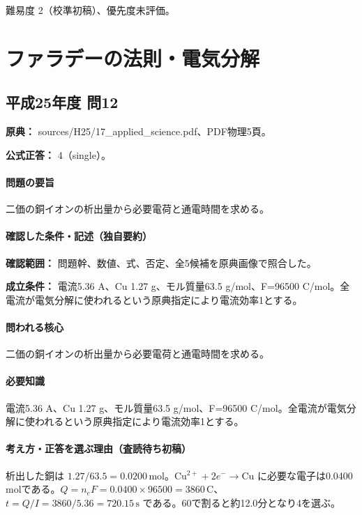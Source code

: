 \par 難易度 2（校準初稿）、優先度未評価。

\section{ファラデーの法則・電気分解}

\subsection{平成25年度 問12}
\label{q:h25-reg-applied-12}

\noindent\textbf{原典：} sources/H25/17\_applied\_science.pdf、PDF物理5頁。

\textbf{公式正答：} 4（single）。

\paragraph{問題の要旨} 二価の銅イオンの析出量から必要電荷と通電時間を求める。

\paragraph{確認した条件・記述（独自要約）}\mbox{}\par

\noindent\textbf{確認範囲：} 問題幹、数値、式、否定、全5候補を原典画像で照合した。\par

\noindent\textbf{成立条件：} 電流5.36 A、Cu 1.27 g、モル質量63.5 g/mol、F=\allowbreak{}96500 C/mol。全電流が電気分解に使われるという原典指定により電流効率1とする。\par

\paragraph{問われる核心} 二価の銅イオンの析出量から必要電荷と通電時間を求める。

\paragraph{必要知識} 電流5.36 A、Cu 1.27 g、モル質量63.5 g/mol、F=\allowbreak{}96500 C/mol。全電流が電気分解に使われるという原典指定により電流効率1とする。

\paragraph{考え方・正答を選ぶ理由（査読待ち初稿）} 析出した銅は \(1.27/63.5=0.0200\,\mathrm{mol}\)。\(\mathrm{Cu^{2+}}+2e^-\to\mathrm{Cu}\) に必要な電子は0.0400 molである。\(Q=n_eF=0.0400\times96500=3860\,\mathrm C\)、\(t=Q/I=3860/5.36=720.15\,\mathrm s\) である。60で割ると約12.0分となり4を選ぶ。

